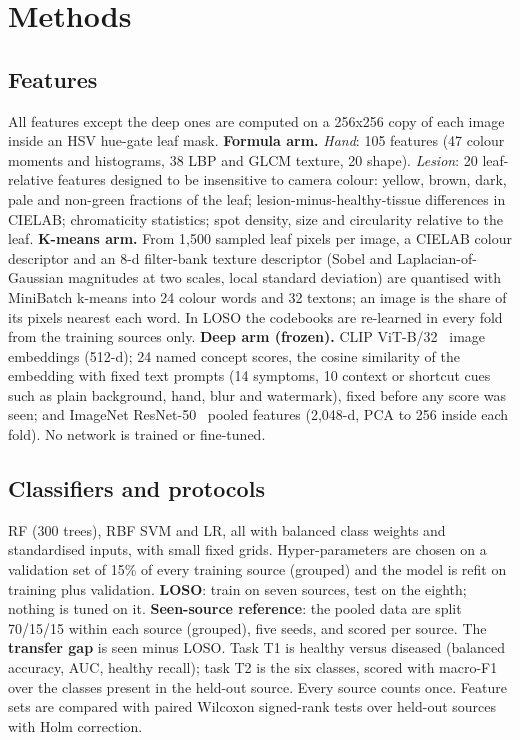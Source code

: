 \documentclass[conference]{IEEEtran}
\begin{document}
\section{Methods}
\subsection{Features}
All features except the deep ones are computed on a 256x256 copy of each image inside an HSV hue-gate leaf mask. \textbf{Formula arm.} \emph{Hand}: 105 features (47 colour moments and histograms, 38 LBP and GLCM texture, 20 shape). \emph{Lesion}: 20 leaf-relative features designed to be insensitive to camera colour: yellow, brown, dark, pale and non-green fractions of the leaf; lesion-minus-healthy-tissue differences in CIELAB; chromaticity statistics; spot density, size and circularity relative to the leaf. \textbf{K-means arm.} From 1,500 sampled leaf pixels per image, a CIELAB colour descriptor and an 8-d filter-bank texture descriptor (Sobel and Laplacian-of-Gaussian magnitudes at two scales, local standard deviation) are quantised with MiniBatch k-means into 24 colour words and 32 textons; an image is the share of its pixels nearest each word. In LOSO the codebooks are re-learned in every fold from the training sources only. \textbf{Deep arm (frozen).} CLIP ViT-B/32~\cite{r46,r49} image embeddings (512-d); 24 named concept scores, the cosine similarity of the embedding with fixed text prompts (14 symptoms, 10 context or shortcut cues such as plain background, hand, blur and watermark), fixed before any score was seen; and ImageNet ResNet-50~\cite{r50} pooled features (2,048-d, PCA to 256 inside each fold). No network is trained or fine-tuned.

\subsection{Classifiers and protocols}
RF (300 trees), RBF SVM and LR, all with balanced class weights and standardised inputs, with small fixed grids. Hyper-parameters are chosen on a validation set of 15\% of every training source (grouped) and the model is refit on training plus validation. \textbf{LOSO}: train on seven sources, test on the eighth; nothing is tuned on it. \textbf{Seen-source reference}: the pooled data are split 70/15/15 within each source (grouped), five seeds, and scored per source. The \textbf{transfer gap} is seen minus LOSO. Task T1 is healthy versus diseased (balanced accuracy, AUC, healthy recall); task T2 is the six classes, scored with macro-F1 over the classes present in the held-out source. Every source counts once. Feature sets are compared with paired Wilcoxon signed-rank tests over held-out sources with Holm correction.
\end{document}
